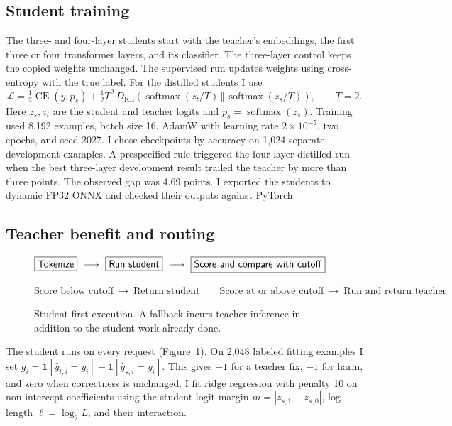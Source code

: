 \documentclass{article}
\begin{document}
\subsection{Student training}
The three- and four-layer students start with the teacher's embeddings, the first three or four transformer layers, and its classifier. The three-layer control keeps the copied weights unchanged. The supervised run updates weights using cross-entropy with the true label. For the distilled students I use
\begin{equation}
 \mathcal L = \tfrac12 \operatorname{CE}(y,p_s)
 + \tfrac12 T^2\,D_{\mathrm{KL}}\!\left(
     \operatorname{softmax}(z_t/T)\,\Vert\,\operatorname{softmax}(z_s/T)\right),
 \qquad T=2.
\end{equation}
Here \(z_s,z_t\) are the student and teacher logits and \(p_s=\operatorname{softmax}(z_s)\). Training used 8,192 examples, batch size 16, AdamW with learning rate \(2\times10^{-5}\), two epochs, and seed 2027. I chose checkpoints by accuracy on 1,024 separate development examples. A prespecified rule triggered the four-layer distilled run when the best three-layer development result trailed the teacher by more than three points. The observed gap was 4.69 points. I exported the students to dynamic FP32 ONNX and checked their outputs against PyTorch.

\subsection{Teacher benefit and routing}
\begin{figure}[H]
  \centering
  \setlength{\fboxsep}{6pt}
  \(\fbox{\textsf{Tokenize}}\ \longrightarrow\
    \fbox{\textsf{Run student}}\ \longrightarrow\
    \fbox{\textsf{Score and compare with cutoff}}\)
  \par\smallskip
  \(\text{Score below cutoff}\ \longrightarrow\ \text{Return student}
  \qquad
    \text{Score at or above cutoff}\ \longrightarrow\ \text{Run and return teacher}\)
  \caption{Student-first execution. A fallback incurs teacher inference in addition to the student work already done.}
  \label{fig:flow}
\end{figure}
The student runs on every request (Figure~\ref{fig:flow}). On 2,048 labeled fitting examples I set \(g_i=\mathbf{1}[\hat y_{t,i}=y_i]-\mathbf{1}[\hat y_{s,i}=y_i]\). This gives \(+1\) for a teacher fix, \(-1\) for harm, and zero when correctness is unchanged. I fit ridge regression with penalty 10 on non-intercept coefficients using the student logit margin \(m=|z_{s,1}-z_{s,0}|\), log length \(\ell=\log_2 L\), and their interaction.
\end{document}
